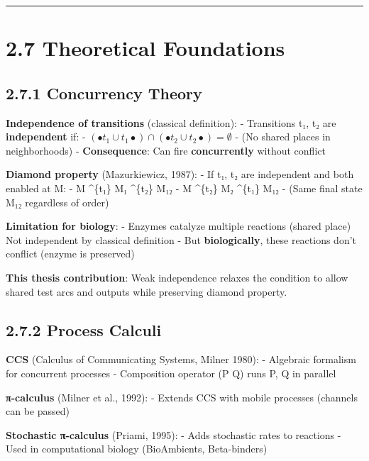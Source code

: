 \begin{center}\rule{0.5\linewidth}{0.5pt}\end{center}

\hypertarget{theoretical-foundations}{%
\section{2.7 Theoretical Foundations}\label{theoretical-foundations}}

\hypertarget{concurrency-theory}{%
\subsection{2.7.1 Concurrency Theory}\label{concurrency-theory}}

\textbf{Independence of transitions} (classical definition): -
Transitions t₁, t₂ are \textbf{independent} if: -
\((\bullet t_1 \cup t_1\bullet) \cap (\bullet t_2 \cup t_2\bullet) = \emptyset\)
- (No shared places in neighborhoods) - \textbf{Consequence}: Can fire
\textbf{concurrently} without conflict

\textbf{Diamond property} (Mazurkiewicz, 1987): - If t₁, t₂ are
independent and both enabled at M: - M \textrightarrow\^{}\{t₁\} M₁ \textrightarrow\^{}\{t₂\} M₁₂ -
M \textrightarrow\^{}\{t₂\} M₂ \textrightarrow\^{}\{t₁\} M₁₂ - (Same final state M₁₂ regardless of
order)

\textbf{Limitation for biology}: - Enzymes catalyze multiple reactions
(shared place) \textrightarrow Not independent by classical definition - But
\textbf{biologically}, these reactions don't conflict (enzyme is
preserved)

\textbf{This thesis contribution}: Weak independence relaxes the
condition to allow shared test arcs and outputs while preserving diamond
property.

\hypertarget{process-calculi}{%
\subsection{2.7.2 Process Calculi}\label{process-calculi}}

\textbf{CCS} (Calculus of Communicating Systems, Milner 1980): -
Algebraic formalism for concurrent processes - Composition operator (P
\textbar{} Q) runs P, Q in parallel

\textbf{π-calculus} (Milner et al., 1992): - Extends CCS with mobile
processes (channels can be passed)

\textbf{Stochastic π-calculus} (Priami, 1995): - Adds stochastic rates
to reactions - Used in computational biology (BioAmbients, Beta-binders)

